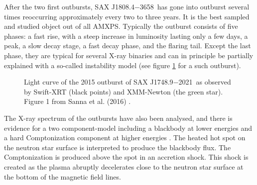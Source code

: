 \documentclass{wihuri}
\def\source{SAX J1808.4$-$3658}
\def\sourceb{SAX J1748.9$-$2021}
\begin{document}

After the two first outbursts, \source \ has gone into outburst several times reoccurring approximately every two to three years. It is the best sampled and studied object out of all AMXPS. Typically the outburst consists of five phases: a fast rise, with a steep increase in luminosity lasting only a few days, a peak, a slow decay stage, a fast decay phase, and the flaring tail. Except the last phase, they are typical for several X-ray binaries and can in principle be partially explained with a so-called instability model \cite{disc-instability} (see figure \ref{fig:outburst} for a such outburst).




\begin{figure}
\centerline{} 
\caption{Light curve of the 2015 outburst of \sourceb \ as observed by Swift-XRT (black points) and XMM-Newton (the green star). Figure 1 from Sanna et al. (2016) \cite{outburst}.}%
\label{fig:outburst}
\end{figure}







The X-ray spectrum of the outbursts have also been analysed, and there is evidence for a two component-model including a blackbody at lower energies and a hard Comptonization component at higher energies \cite{twocompmod} %
. The heated hot spot on the neutron star surface is interpreted to produce the blackbody flux. The Comptonization is produced above the spot in an accretion shock. This shock is created as the plasma abruptly decelerates close to the neutron star surface at the bottom of the magnetic field lines.
\end{document}
